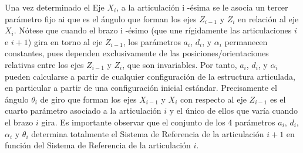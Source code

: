 \documentclass[11pt,a4paper,oldfontcommands,oneside]{memoir}
\begin{document}
Una vez determinado el Eje $X_i$, a la articulación i -ésima se le asocia un tercer parámetro fijo ai que es el ángulo que forman los ejes $Z_{i-1}$ y $Z_i$ en relación al eje $X_i$.
Nótese que cuando el brazo i -ésimo (que une rígidamente las articulaciones $i$ e $i+1$) gira en torno al eje $Z_{i-1}$, los parámetros $a_i$, $d_i$, y $\alpha_i$ permanecen constantes, pues dependen exclusivamente de las posiciones/orientaciones relativas entre los ejes $Z_{i-1}$ y $Z_i$, que son invariables. Por tanto, $a_i$, $d_i$, y $\alpha_i$ pueden calcularse a partir de cualquier configuración de la estructura articulada, en particular a partir de una configuración inicial estándar. Precisamente el ángulo $\theta_i$ de giro que forman los ejes $X_{i-1}$ y $X_i$ con respecto al eje $Z_{i-1}$ es el cuarto parámetro asociado a la articulación $i$ y el único de ellos que varía cuando el brazo $i$ gira.
Es importante observar que el conjunto de los 4 parámetros $a_i$, $d_i$, $\alpha_i$ y $\theta_i$ determina totalmente el Sistema de Referencia de la articulación $i+1$ en función del Sistema de Referencia de la articulación $i$.

\vspace{2cm}
\hfill
\end{document}
